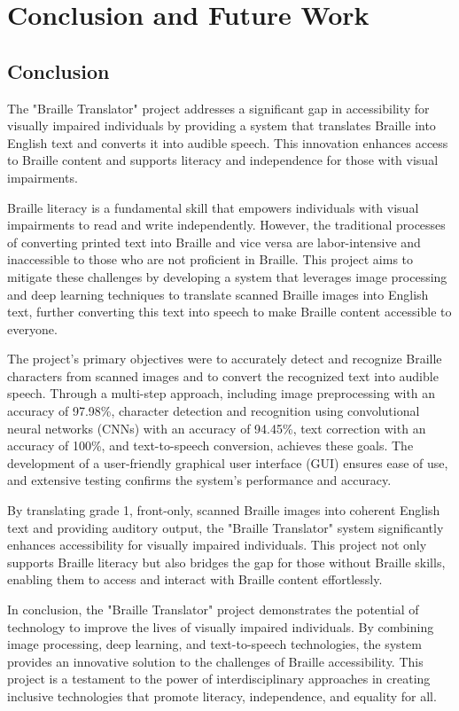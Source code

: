 \section{Conclusion and Future Work}
\subsection{Conclusion}
The "Braille Translator" project addresses a significant gap in accessibility for visually impaired individuals by providing a system that translates Braille into English text and converts it into audible speech. This innovation enhances access to Braille content and supports literacy and independence for those with visual impairments.

Braille literacy is a fundamental skill that empowers individuals with visual impairments to read and write independently. However, the traditional processes of converting printed text into Braille and vice versa are labor-intensive and inaccessible to those who are not proficient in Braille. This project aims to mitigate these challenges by developing a system that leverages image processing and deep learning techniques to translate scanned Braille images into English text, further converting this text into speech to make Braille content accessible to everyone.

The project's primary objectives were to accurately detect and recognize Braille characters from scanned images and to convert the recognized text into audible speech. Through a multi-step approach, including image preprocessing with an accuracy of 97.98\%, character detection and recognition using convolutional neural networks (CNNs) with an accuracy of 94.45\%, text correction with an accuracy of 100\%, and text-to-speech conversion, achieves these goals. The development of a user-friendly graphical user interface (GUI) ensures ease of use, and extensive testing confirms the system's performance and accuracy.

By translating grade 1, front-only, scanned Braille images into coherent English text and providing auditory output, the "Braille Translator" system significantly enhances accessibility for visually impaired individuals. This project not only supports Braille literacy but also bridges the gap for those without Braille skills, enabling them to access and interact with Braille content effortlessly.

In conclusion, the "Braille Translator" project demonstrates the potential of technology to improve the lives of visually impaired individuals. By combining image processing, deep learning, and text-to-speech technologies, the system provides an innovative solution to the challenges of Braille accessibility. This project is a testament to the power of interdisciplinary approaches in creating inclusive technologies that promote literacy, independence, and equality for all.





